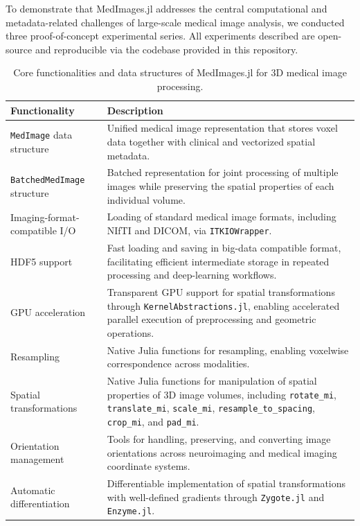 \documentclass[a4paper,10pt]{elsarticle}
\begin{document}
To demonstrate that MedImages.jl addresses the central computational and metadata-related challenges of large-scale medical image analysis, we conducted three proof-of-concept experimental series.  All experiments described are open-source and reproducible via the codebase provided in this repository.

\begin{table}[H]
\centering
\caption{Core functionalities and data structures of MedImages.jl for 3D medical image processing.}
\label{tab:medimages_functionalities}
\renewcommand{\arraystretch}{1.2}
\begin{tabular}{|p{}|p{}|}
\hline
\textbf{Functionality} & \textbf{Description} \\
\hline
\texttt{MedImage} data structure & Unified medical image representation that stores voxel data together with clinical and vectorized spatial metadata. \\
\hline
\texttt{BatchedMedImage} structure & Batched representation for joint processing of multiple images while preserving the spatial properties of each individual volume. \\
\hline
Imaging-format-compatible I/O & Loading of standard medical image formats, including NIfTI and DICOM, via \texttt{ITKIOWrapper}. \\
\hline
HDF5 support & Fast loading and saving in big-data compatible format, facilitating efficient intermediate storage in repeated processing and deep-learning workflows. \\
\hline
GPU acceleration & Transparent GPU support for spatial transformations through \texttt{KernelAbstractions.jl}, enabling accelerated parallel execution of preprocessing and geometric operations. \\
\hline
Resampling & Native Julia functions for resampling, enabling voxelwise correspondence across modalities. \\
\hline
Spatial transformations & Native Julia functions for manipulation of spatial properties of 3D image volumes, including \texttt{rotate\_mi}, \texttt{translate\_mi}, \texttt{scale\_mi}, \texttt{resample\_to\_spacing}, \texttt{crop\_mi}, and \texttt{pad\_mi}. \\
\hline
Orientation management & Tools for handling, preserving, and converting image orientations across neuroimaging and medical imaging coordinate systems. \\
\hline
Automatic differentiation & Differentiable implementation of spatial transformations with well-defined gradients through \texttt{Zygote.jl} and \texttt{Enzyme.jl}. \\
\hline
\end{tabular}
\end{table}
\end{document}
